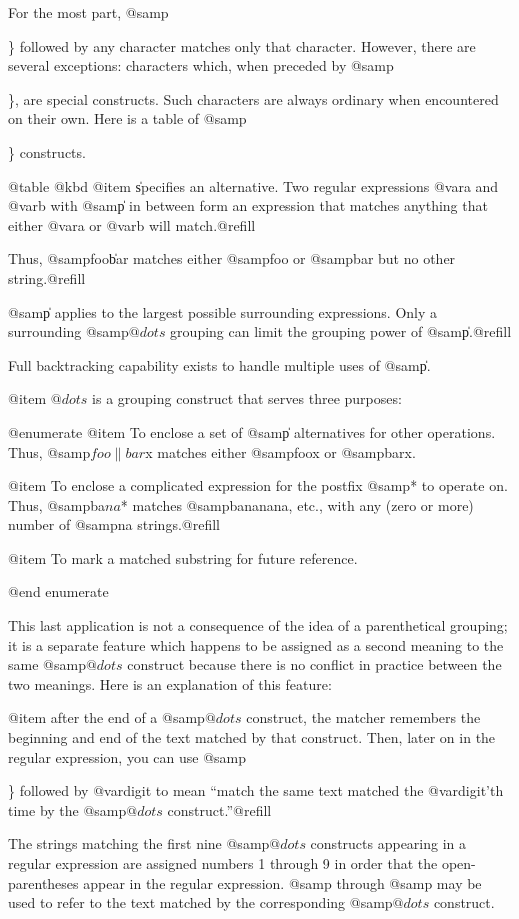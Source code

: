 {{{{{{{{{{{{{{For the most part, @samp{\} followed by any character matches only
that character.  However, there are several exceptions: characters
which, when preceded by @samp{\}, are special constructs.  Such
characters are always ordinary when encountered on their own.  Here
is a table of @samp{\} constructs.

@table @kbd
@item \|
specifies an alternative.
Two regular expressions @var{a} and @var{b} with @samp{\|} in
between form an expression that matches anything that either @var{a} or
@var{b} will match.@refill

Thus, @samp{foo\|bar} matches either @samp{foo} or @samp{bar}
but no other string.@refill

@samp{\|} applies to the largest possible surrounding expressions.  Only a
surrounding @samp{\( @dots{} \)} grouping can limit the grouping power of
@samp{\|}.@refill

Full backtracking capability exists to handle multiple uses of @samp{\|}.

@item \( @dots{} \)
is a grouping construct that serves three purposes:

@enumerate
@item
To enclose a set of @samp{\|} alternatives for other operations.
Thus, @samp{\(foo\|bar\)x} matches either @samp{foox} or @samp{barx}.

@item
To enclose a complicated expression for the postfix @samp{*} to operate on.
Thus, @samp{ba\(na\)*} matches @samp{bananana}, etc., with any (zero or
more) number of @samp{na} strings.@refill

@item
To mark a matched substring for future reference.

@end enumerate

This last application is not a consequence of the idea of a
parenthetical grouping; it is a separate feature which happens to be
assigned as a second meaning to the same @samp{\( @dots{} \)} construct
because there is no conflict in practice between the two meanings.
Here is an explanation of this feature:

@item 
after the end of a @samp{\( @dots{} \)} construct, the matcher remembers the
beginning and end of the text matched by that construct.  Then, later on
in the regular expression, you can use @samp{\} followed by @var{digit}
to mean ``match the same text matched the @var{digit}'th time by the
@samp{\( @dots{} \)} construct.''@refill

The strings matching the first nine @samp{\( @dots{} \)} constructs appearing
in a regular expression are assigned numbers 1 through 9 in order that the
open-parentheses appear in the regular expression.  @samp{\1} through
@samp{\9} may be used to refer to the text matched by the corresponding
@samp{\( @dots{} \)} construct.

}}}}}}}}}}}}}}}}}}
